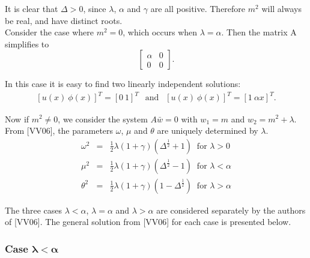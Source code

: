 \documentclass[../../main.tex]{subfiles}
\begin{document}
It is clear that $\Delta>0$, since $\lambda$, $\alpha$ and $\gamma$ are all positive. Therefore $m^{2}$ will always be real, and have distinct roots.\\

Consider the case where $m^{2} = 0$, which occurs when $\lambda = \alpha$. Then the matrix A simplifies to
\begin{equation*}
\begin{bmatrix}
	\alpha & 0\\
	0&0
	\end{bmatrix}.
\end{equation*}

In  this case it is easy to find two linearly independent solutions:
\begin{eqnarray*}
\left[u(x) \ \phi(x)\right]^{T} = \left[0 \ 1 \right]^{T} \ \ \textrm{ and } \ \ \left[u(x) \ \phi(x)\right]^{T} = \left[1 \ \alpha x \right]^{T}.
\end{eqnarray*}



Now if $m^{2} \neq 0$, we consider the system $A\bar{w}=0$ with $w_{1} = m$ and $w_{2} = m^{2} + \lambda$. From [VV06], the parameters $\omega$, $\mu$ and $\theta$ are uniquely determined by $\lambda$.
\begin{eqnarray}
	\omega^2 & = & \frac{1}{2}\lambda(1+\gamma)(\Delta^{\frac{1}{2}}+1) \ \textrm{ for } \lambda >0\\
	\mu^2 & = & \frac{1}{2}\lambda(1+\gamma)(\Delta^{\frac{1}{2}}-1) \ \textrm{ for } \lambda < \alpha\\
	\theta^2 & = & \frac{1}{2}\lambda(1+\gamma)(1-\Delta^{\frac{1}{2}}) \ \textrm{ for } \lambda > \alpha
\end{eqnarray}

 The three cases $\lambda < \alpha$, $\lambda = \alpha$ and $\lambda > \alpha$ are considered separately by the authors of [VV06]. The general solution from [VV06] for each case is presented below.

\subsubsection{Case $\boldsymbol{\lambda<\alpha}$}
\end{document}
